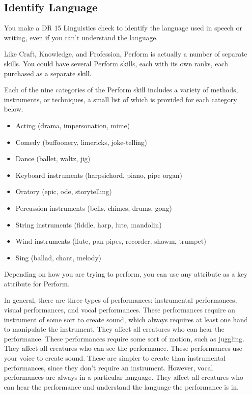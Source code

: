     \subsection{Identify Language}
        You make a DR 15 Linguistics check to identify the language used in speech or writing, even if you can't understand the language.

        \par Like Craft, Knowledge, and Profession, Perform is actually a number of separate skills. You could have several Perform skills, each with its own ranks, each purchased as a separate skill.

        Each of the nine categories of the Perform skill includes a variety of methods, instruments, or techniques, a small list of which is provided for each category below.
        \begin{itemize}
            \item Acting (drama, impersonation, mime)
            \item Comedy (buffoonery, limericks, joke-telling)
            \item Dance (ballet, waltz, jig)
            \item Keyboard instruments (harpsichord, piano, pipe organ)
            \item Oratory (epic, ode, storytelling)
            \item Percussion instruments (bells, chimes, drums, gong)
            \item String instruments (fiddle, harp, lute, mandolin)
            \item Wind instruments (flute, pan pipes, recorder, shawm, trumpet)
            \item Sing (ballad, chant, melody)
        \end{itemize}

        Depending on how you are trying to perform, you can use any attribute as a key attribute for Perform.

        In general, there are three types of performances: instrumental performances, visual performances, and vocal performances.
         These performances require an instrument of some sort to create sound, which always requires at least one hand to manipulate the instrument.
        They affect all creatures who can hear the performance.
         These performances require some sort of motion, such as juggling.
        They affect all creatures who can see the performance.
         These performances use your voice to create sound.
        These are simpler to create than instrumental performances, since they don't require an instrument.
        However, vocal performances are always in a particular language.
        They affect all creatures who can hear the performance and understand the language the performance is in.

